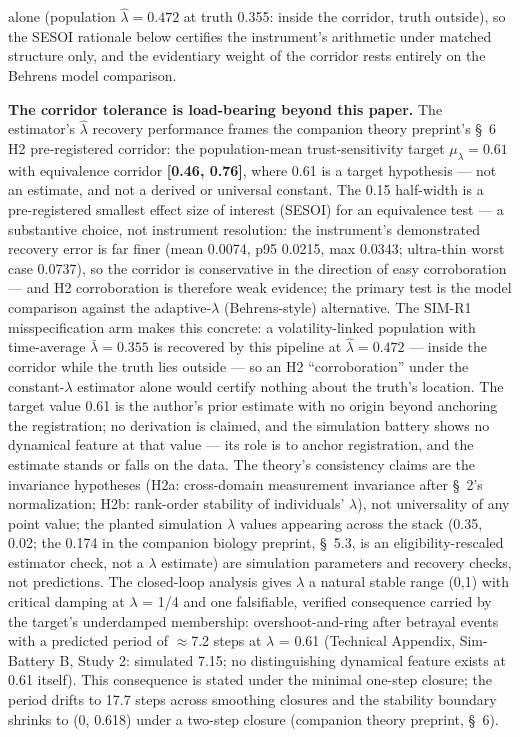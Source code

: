 \documentclass[11pt,twocolumn]{article}
\begin{document}
alone (population $\hat{\lambda} = 0.472$ at truth 0.355: inside the corridor, truth outside), so the SESOI rationale below certifies the instrument's arithmetic under matched structure only, and the evidentiary weight of the corridor rests entirely on the Behrens model comparison.

\textbf{The corridor tolerance is load-bearing beyond this paper.} The estimator's $\hat{\lambda}$ recovery performance frames the companion theory preprint's \S~6 H2 pre-registered corridor: the population-mean trust-sensitivity target $\mu_{\lambda} = 0.61$ with equivalence corridor \textbf{[0.46, 0.76]}, where 0.61 is a target hypothesis --- not an estimate, and not a derived or universal constant. The 0.15 half-width is a pre-registered smallest effect size of interest (SESOI) for an equivalence test --- a substantive choice, not instrument resolution: the instrument's demonstrated recovery error is far finer (mean 0.0074, p95 0.0215, max 0.0343; ultra-thin worst case 0.0737), so the corridor is conservative in the direction of easy corroboration --- and H2 corroboration is therefore weak evidence; the primary test is the model comparison against the adaptive-$\lambda$ (Behrens-style) alternative. The SIM-R1 misspecification arm makes this concrete: a volatility-linked population with time-average $\bar{\lambda} = 0.355$ is recovered by this pipeline at $\hat{\lambda} = 0.472$ --- inside the corridor while the truth lies outside --- so an H2 ``corroboration'' under the constant-$\lambda$ estimator alone would certify nothing about the truth's location. The target value 0.61 is the author's prior estimate with no origin beyond anchoring the registration; no derivation is claimed, and the simulation battery shows no dynamical feature at that value --- its role is to anchor registration, and the estimate stands or falls on the data. The theory's consistency claims are the invariance hypotheses (H2a: cross-domain measurement invariance after \S~2's normalization; H2b: rank-order stability of individuals' $\lambda$), not universality of any point value; the planted simulation $\lambda$ values appearing across the stack (0.35, 0.02; the 0.174 in the companion biology preprint, \S~5.3, is an eligibility-rescaled estimator check, not a $\lambda$ estimate) are simulation parameters and recovery checks, not predictions. The closed-loop analysis gives $\lambda$ a natural stable range (0,1) with critical damping at $\lambda$ = 1/4 and one falsifiable, verified consequence carried by the target's underdamped membership: overshoot-and-ring after betrayal events with a predicted period of $\approx$7.2 steps at $\lambda$ = 0.61 (Technical Appendix, Sim-Battery B, Study 2: simulated 7.15; no distinguishing dynamical feature exists at 0.61 itself). This consequence is stated under the minimal one-step closure; the period drifts to 17.7 steps across smoothing closures and the stability boundary shrinks to (0, 0.618) under a two-step closure (companion theory preprint, \S~6).
\end{document}
